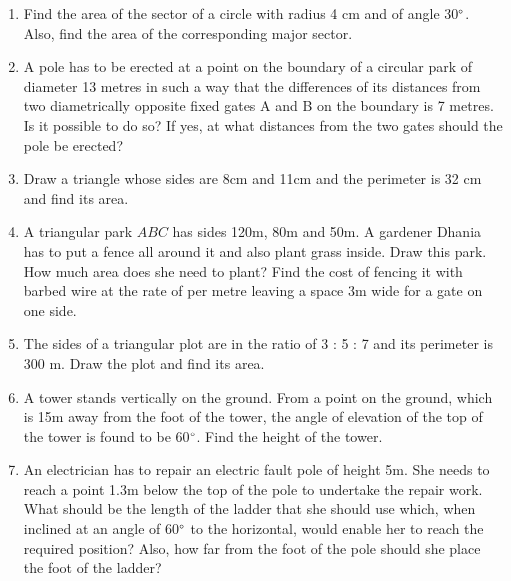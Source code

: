 \begin{enumerate}[label=\arabic*.,ref=\thesubsection.\theenumi]
\item Find the area of the sector of a circle with radius 4 cm and of angle 30$\degree$. Also, find the area of the corresponding major sector.
\item A pole has to be erected at a point on the boundary of a circular park of diameter 13 metres in such a way that the differences of its distances from two diametrically opposite fixed gates A and B on the boundary is 7 metres. Is it possible to do so? If yes, at what distances from the two gates should the pole be erected?
%
\item Draw a triangle whose sides are 8cm and 11cm and the perimeter is 32 cm and find its area.
%
%
\item A triangular park $ABC$ has sides 120m, 80m and 50m. A gardener Dhania has to put a fence all around it and also plant grass inside. Draw this park.  How much area does she need to plant? Find the cost of fencing it with barbed wire at the rate of  per metre leaving a space 3m wide for a gate on one side.
%
\item The sides of a triangular plot are in the ratio of 3 : 5 : 7 and its perimeter is 300 m. Draw the plot and find its area.
\item A tower stands vertically on the ground.  From a point on the ground, which is 15m away from the foot of the tower, the angle of elevation of the top of the tower is found to be 60$\degree$.  Find the height of the tower.
%
%
\item An electrician has to repair an electric fault pole of height 5m.  She needs to reach a point 1.3m below the top of the pole to undertake the repair work.  What should be the length of the ladder that she should use which, when inclined at an angle of 60$\degree$ to the horizontal, would enable her to reach the required position?  Also, how far from the foot of the pole should she place the foot of the ladder?

\end{enumerate}
